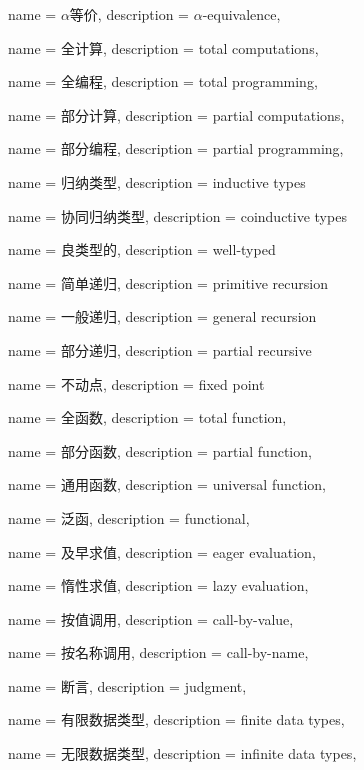 
{
    name = $\alpha$等价,
    description = {$\alpha$-equivalence},
}

{
	name = 全计算,
	description = {total computations},
}

{
	name = 全编程,
	description = {total programming},
}

{
	name = 部分计算,
	description = {partial computations},
}

{
	name = 部分编程,
	description = {partial programming},
}

{
	name = 归纳类型,
	description = {inductive types}
}

{
	name = 协同归纳类型,
	description = {coinductive types}
}

{
	name = 良类型的,
	description = {well-typed}
}

{
	name = 简单递归,
	description = {primitive recursion}
}


{
	name = 一般递归,
	description = {general recursion}
}

{
	name = 部分递归,
	description = {partial recursive}
}

{
	name = 不动点,
	description = {fixed point}
}

{
	name = 全函数,
	description = {total function},
}


{
	name = 部分函数,
	description = {partial function},
}

{
	name = 通用函数,
	description = {universal function},
}


{
	name = 泛函,
	description = {functional},
}

{
	name = 及早求值,
	description = {eager evaluation},
}


{
	name = 惰性求值,
	description = {lazy evaluation},
}

{
	name = 按值调用,
	description = {call-by-value},
}


{
	name = 按名称调用,
	description = {call-by-name},
}

{
	name = 断言,
	description = {judgment},
}

{
	name = 有限数据类型,
	description = {finite data types},
}


{
	name = 无限数据类型,
	description = {infinite data types},
}

